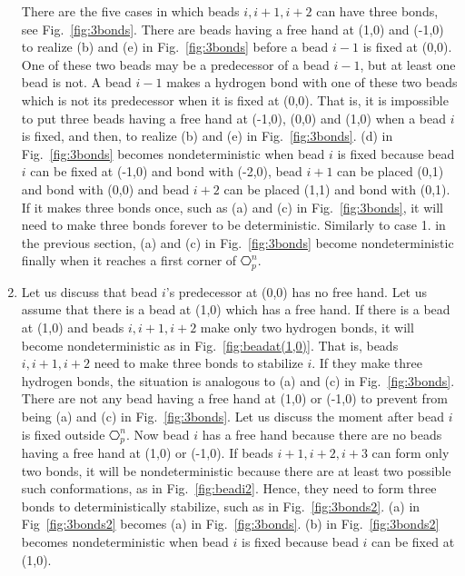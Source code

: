 \begin{enumerate}
There are the five cases in which beads $i, i+1, i+2$ can have three bonds, see Fig.~\ref{fig:3bonds}. There are beads having a free hand at (1,0) and (-1,0) to realize (b) and (e) in Fig.~\ref{fig:3bonds} before a bead $i-1$ is fixed at (0,0). One of these two beads may be a predecessor of a bead $i-1$, but at least one bead is not. A bead $i-1$ makes a hydrogen bond with one of these two beads which is not its predecessor when it is fixed at (0,0). That is, it is impossible to put three beads having a free hand at (-1,0), (0,0) and (1,0) when a bead $i$ is fixed, and then, to realize (b) and (e) in Fig.~\ref{fig:3bonds}. (d) in Fig.~\ref{fig:3bonds} becomes nondeterministic when bead $i$ is fixed because bead $i$ can be fixed at (-1,0) and bond with (-2,0), bead $i+1$ can be placed (0,1) and bond with (0,0) and bead $i+2$ can be placed (1,1) and bond with (0,1). If it makes three bonds once, such as (a) and (c) in Fig.~\ref{fig:3bonds}, it will need to make three bonds forever to be deterministic. Similarly to case 1. in the previous section, (a) and (c) in Fig.~\ref{fig:3bonds} become nondeterministic finally when it reaches a first corner of $\hexagon_p^n$.



\item Let us discuss that bead $i$'s predecessor at (0,0) has no free hand. Let us assume that there is a bead at (1,0) which has a free hand. If there is a bead at (1,0) and beads $i, i+1, i+2$ make only two hydrogen bonds, it will become nondeterministic as in Fig.~\ref{fig:beadat(1,0)}. That is, beads $i, i+1, i+2$ need to make three bonds to stabilize $i$. If they make three hydrogen bonds, the situation is analogous to (a) and (c) in Fig.~\ref{fig:3bonds}. There are not any bead having a free hand at (1,0) or (-1,0) to prevent from being (a) and (c) in Fig.~\ref{fig:3bonds}. Let us discuss the moment after bead $i$ is fixed outside $\hexagon_p^n$. Now bead $i$ has a free hand because there are no beads having a free hand at (1,0) or (-1,0). If beads $i+1, i+2, i+3$ can form only two bonds, it will be nondeterministic because there are at least two possible such conformations, as in Fig.~\ref{fig:beadi2}. Hence, they need to form three bonds to deterministically stabilize, such as in Fig.~\ref{fig:3bonds2}. (a) in Fig~\ref{fig:3bonds2} becomes (a) in Fig.~\ref{fig:3bonds}. (b) in Fig.~\ref{fig:3bonds2} becomes nondeterministic when bead $i$ is fixed because bead $i$ can be fixed at (1,0).\\


\end{enumerate}
